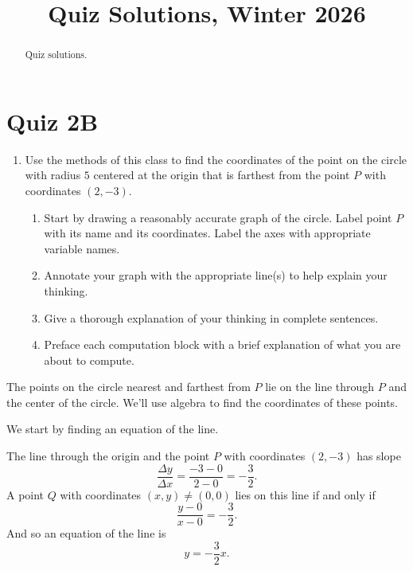 \documentclass{ximera}
\title{Quiz Solutions, Winter 2026}
\begin{document}
\begin{abstract}
Quiz solutions.
\end{abstract}
\maketitle


\section{Quiz 2B}

\begin{question} \label{Q2BDrel}

\begin{enumerate}

\item Use the methods of this class to find the coordinates of the point on the circle with radius $5$ centered at the origin that is farthest from the point $P$ with coordinates $(2,-3)$.

\begin{enumerate}
\item Start by drawing a reasonably accurate graph of the circle. Label point $P$ with its name and its coordinates. Label the axes with appropriate variable names.

\item Annotate your graph with the appropriate line(s) to help explain your thinking. 

\item Give a thorough explanation of your thinking in complete sentences.

\item Preface each computation block with a brief explanation of what you are about to compute.

\end{enumerate}
\end{enumerate}


\begin{explanation}
The points on the circle nearest and farthest from $P$ lie on the line through $P$ and the center of the circle. We'll use algebra to find the coordinates of these points.

We start by finding an equation of the line.

The line through the origin and the point $P$ with coordinates $(2,-3)$ has slope
\[
      \frac{\Delta y}{\Delta x} = \frac{-3-0}{2-0} = - \frac{3}{2} .
\]
A point $Q$ with coordinates $(x,y) \neq (0,0)$ lies on this line if and only if
\[
      \frac{y-0}{x-0} = - \frac{3}{2} .
\] 
And so an equation of the line is
\[
  y = - \frac{3}{2}x .
\]


\end{explanation}
\end{question}
\end{document}
